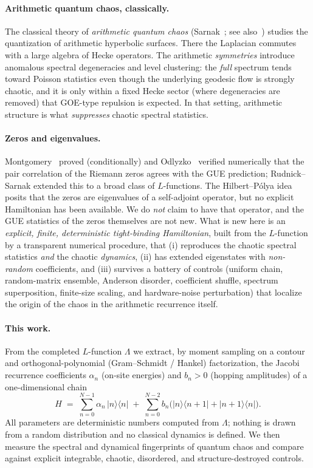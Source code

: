 \documentclass[aps,prx,reprint,floatfix]{revtex4-2}
\begin{document}
\paragraph{Arithmetic quantum chaos, classically.}
The classical theory of \emph{arithmetic quantum chaos}
(Sarnak~\cite{sarnak1995}; see also~\cite{rudnick1996}) studies the
quantization of arithmetic hyperbolic surfaces. There the Laplacian commutes
with a large algebra of Hecke operators. The arithmetic \emph{symmetries}
introduce anomalous spectral degeneracies and level clustering: the
\emph{full} spectrum tends toward Poisson statistics even though the
underlying geodesic flow is strongly chaotic, and it is only within a fixed
Hecke sector (where degeneracies are removed) that GOE-type repulsion is
expected. In that setting, arithmetic structure is what \emph{suppresses}
chaotic spectral statistics.

\paragraph{Zeros and eigenvalues.}
Montgomery~\cite{montgomery1973} proved (conditionally) and
Odlyzko~\cite{odlyzko1987} verified numerically that the pair correlation of
the Riemann zeros agrees with the GUE prediction; Rudnick--Sarnak extended
this to a broad class of $L$-functions. The Hilbert--P\'olya idea posits that
the zeros are eigenvalues of a self-adjoint operator, but no explicit
Hamiltonian has been available. We do \emph{not} claim to have that operator,
and the GUE statistics of the zeros themselves are not new. What is new here
is an \emph{explicit, finite, deterministic tight-binding Hamiltonian}, built
from the $L$-function by a transparent numerical procedure, that (i)
reproduces the chaotic spectral statistics \emph{and} the chaotic
\emph{dynamics}, (ii) has extended eigenstates with \emph{non-random}
coefficients, and (iii) survives a battery of controls (uniform chain,
random-matrix ensemble, Anderson disorder, coefficient shuffle, spectrum
superposition, finite-size scaling, and hardware-noise perturbation) that
localize the origin of the chaos in the arithmetic recurrence itself.

\paragraph{This work.}
From the completed $L$-function $\Lambda$ we extract, by moment sampling on a
contour and orthogonal-polynomial (Gram--Schmidt / Hankel) factorization, the
Jacobi recurrence coefficients $\alpha_n$ (on-site energies) and $b_n>0$
(hopping amplitudes) of a one-dimensional chain
\begin{equation}
H \;=\; \sum_{n=0}^{N-1}\alpha_n\,|n\rangle\langle n|
       \;+\; \sum_{n=0}^{N-2} b_n\bigl(|n\rangle\langle n\!+\!1|
       +|n\!+\!1\rangle\langle n|\bigr).
\label{eq:H}
\end{equation}
All parameters are deterministic numbers computed from $\Lambda$; nothing is
drawn from a random distribution and no classical dynamics is defined. We
then measure the spectral and dynamical fingerprints of quantum chaos and
compare against explicit integrable, chaotic, disordered, and
structure-destroyed controls.
\end{document}
